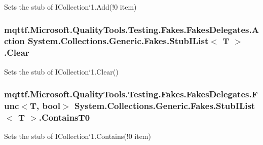 Sets the stub of I\-Collection`1.Add(!0 item)

\hypertarget{class_system_1_1_collections_1_1_generic_1_1_fakes_1_1_stub_i_list_3_01_t_01_4_a3cf7b544aacc464cf7cb4dac87306f6a}{
\subsubsection[{Clear}]{\setlength{\rightskip}{0pt plus 5cm}mqttf.\-Microsoft.\-Quality\-Tools.\-Testing.\-Fakes.\-Fakes\-Delegates.\-Action System.\-Collections.\-Generic.\-Fakes.\-Stub\-I\-List$<$ T $>$.Clear}}\label{class_system_1_1_collections_1_1_generic_1_1_fakes_1_1_stub_i_list_3_01_t_01_4_a3cf7b544aacc464cf7cb4dac87306f6a}


Sets the stub of I\-Collection`1.Clear()

\hypertarget{class_system_1_1_collections_1_1_generic_1_1_fakes_1_1_stub_i_list_3_01_t_01_4_a8161a4638473b226af1cb1d7b11b7c99}{
\subsubsection[{Contains\-T0}]{\setlength{\rightskip}{0pt plus 5cm}mqttf.\-Microsoft.\-Quality\-Tools.\-Testing.\-Fakes.\-Fakes\-Delegates.\-Func$<$T, bool$>$ System.\-Collections.\-Generic.\-Fakes.\-Stub\-I\-List$<$ T $>$.Contains\-T0}}\label{class_system_1_1_collections_1_1_generic_1_1_fakes_1_1_stub_i_list_3_01_t_01_4_a8161a4638473b226af1cb1d7b11b7c99}


Sets the stub of I\-Collection`1.Contains(!0 item)

